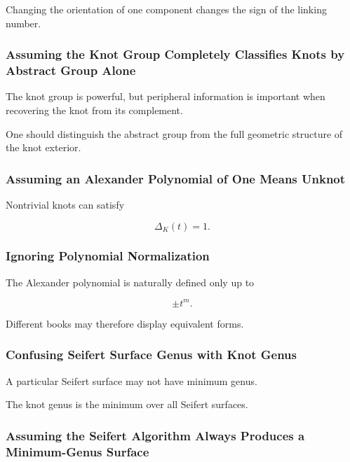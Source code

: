 Changing the orientation of one component changes the sign of the linking
number.

\subsubsection{Assuming the Knot Group Completely Classifies Knots by Abstract Group Alone}

The knot group is powerful, but peripheral information is important when
recovering the knot from its complement.

One should distinguish the abstract group from the full geometric structure
of the knot exterior.

\subsubsection{Assuming an Alexander Polynomial of One Means Unknot}

Nontrivial knots can satisfy

\[
\boxed{
\Delta_K(t)=1.
}
\]

\subsubsection{Ignoring Polynomial Normalization}

The Alexander polynomial is naturally defined only up to

\[
\boxed{
\pm t^m.
}
\]

Different books may therefore display equivalent forms.

\subsubsection{Confusing Seifert Surface Genus with Knot Genus}

A particular Seifert surface may not have minimum genus.

The knot genus is the minimum over all Seifert surfaces.

\subsubsection{Assuming the Seifert Algorithm Always Produces a Minimum-Genus Surface}

